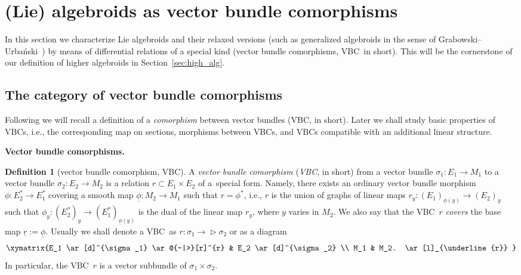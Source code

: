 \documentclass[10pt,a4paper]{amsart}
\newcommand{\ZM}{{VBC}} %
\newcommand{\Zakrzewski}{{vector bundle comorphism}}
\newcommand{\BIGZakrzewski}{{Vector bundle comorphism}}
\newcommand{\und}{\underline}
\newcommand{\ra}{\rightarrow}
\def\relto{\rightarrow\!\!\vartriangleright} %
\numberwithin{equation}{section}
\theoremstyle{definition}
\newtheorem{df}[thm]{Definition}
\begin{document}
\section{(Lie) algebroids as \Zakrzewski s}\label{sec:algebroids_as_zm}

In this section we characterize Lie algebroids and their relaxed versions (such as generalized algebroids in the sense of Grabowski--Urba\'nski~\cite{JG_PU_Algebroids_1999}) by means of differential relations of a special kind (\Zakrzewski s, \ZM\ in short). This will be the cornerstone of our definition of higher algebroids in Section~\ref{sec:high_alg}.

\subsection{The category of \Zakrzewski s}

Following \cite{HM_1993, Mackenzie_lie_2005} we will recall a definition of a \emph{comorphism} between vector bundles (\ZM, in short). Later we shall study basic properties of \ZM s, i.e., the corresponding map on sections, morphisms between \ZM s, and \ZM s compatible with an additional linear structure.

{\bf \BIGZakrzewski s.}
\begin{df}[\Zakrzewski, \ZM ]\label{def:zm} A \emph{\Zakrzewski } (\emph{\ZM }, in short) from a vector bundle $\sigma_1\colon E_1\ra M_1$ to a vector bundle $\sigma_2\colon E_2\ra M_2$ is a relation $r\subset E_1 \times E_2$ of a~special form. Namely, there exists an ordinary vector bundle morphism $\phi\colon E_2^\ast\ra E_1^\ast$ covering a smooth map $\und{\phi}\colon M_2\ra M_1$ such that $r = \phi^\ast$, i.e., $r$ is the union of graphs of linear maps $r_y\colon (E_1)_{\und{\phi}(y)} \ra (E_2)_{y}$ such that $\phi_y\colon (E_2^\ast)_{y} \ra (E_1^\ast)_{\und{\phi}(y)}$ is the dual of the linear map $r_y$, where $y$ varies in $M_2$. We also say that the \ZM\ $r$ \emph{covers} the base map $\und{r}:=\und{\phi}$. Usually we shall denote a \ZM\ as $r\colon \sigma_1\relto \sigma_2$ or as a diagram
\begin{gather*}
\xymatrix{E_1 \ar[d]^{\sigma_1} \ar@{-|>}[r]^{r} & E_2 \ar[d]^{\sigma_2} \\ %
M_1 & M_2. \ar[l]_{\und{r}} }
\end{gather*}
In particular, the \ZM\ $r$ is a vector subbundle of $\sigma_1\times \sigma_2$.
\end{df}
\end{document}

